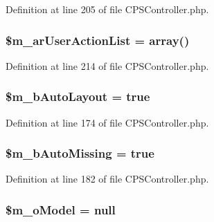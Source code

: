 Definition at line 205 of file CPSController.php.

\hypertarget{classCPSController_ab936222c5497f6831286605649606119}{
\subsubsection[{\$m\_\-arUserActionList}]{\setlength{\rightskip}{0pt plus 5cm}\$m\_\-arUserActionList = {\bf array}()}}
\label{classCPSController_ab936222c5497f6831286605649606119}


Definition at line 214 of file CPSController.php.

\hypertarget{classCPSController_a82f270690d35ca2d667930309b40e52e}{
\subsubsection[{\$m\_\-bAutoLayout}]{\setlength{\rightskip}{0pt plus 5cm}\$m\_\-bAutoLayout = true}}
\label{classCPSController_a82f270690d35ca2d667930309b40e52e}


Definition at line 174 of file CPSController.php.

\hypertarget{classCPSController_a348549b714d32b0cd44fe0e63100ed8a}{
\subsubsection[{\$m\_\-bAutoMissing}]{\setlength{\rightskip}{0pt plus 5cm}\$m\_\-bAutoMissing = true}}
\label{classCPSController_a348549b714d32b0cd44fe0e63100ed8a}


Definition at line 182 of file CPSController.php.

\hypertarget{classCPSController_ac050ea66692a19671c369961a81fb7f7}{
\subsubsection[{\$m\_\-oModel}]{\setlength{\rightskip}{0pt plus 5cm}\$m\_\-oModel = null}}
\label{classCPSController_ac050ea66692a19671c369961a81fb7f7}


